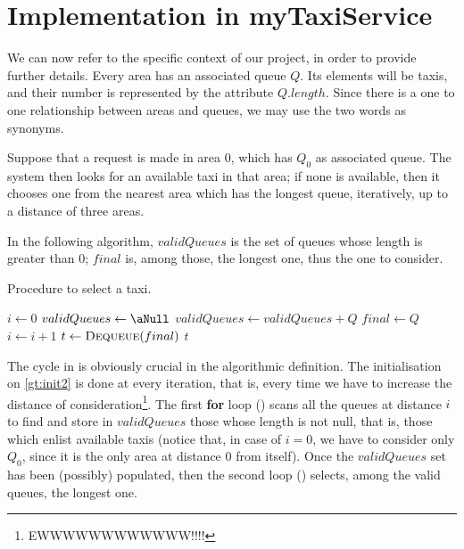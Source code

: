 \clearpage

\section{Implementation in myTaxiService}
We can now refer to the specific context of our project, in order to provide further details. Every area has an associated queue $Q$. Its elements will be taxis, and their number is represented by the attribute $Q.length$. Since there is a one to one relationship between areas and queues, we may use the two words as synonyms.

Suppose that a request is made in area $0$, which has $Q_0$ as associated queue. The system then looks for an available taxi in that area; if none is available, then it chooses one from the nearest area which has the longest queue, iteratively, up to a distance of three areas.

In the following algorithm, $validQueues$ is the set of queues whose length is greater than $0$; $final$ is, among those, the longest one, thus the one to consider.

\begin{algorithm}
\caption{Procedure to select a taxi.} \label{alg:getTaxi}
\begin{algorithmic}[1]
	\State $i \gets 0$  %
	\Repeat \label{gt:repeat}
		\State $validQueues \gets \aNull$ \label{gt:init2}
		\label{gt:forValid}
				\State $validQueues \gets validQueues + Q$
			\EndIf
		\EndFor\label{gt:endForValid}
		\label{gt:forFinal}
				\State $final \gets Q$
			\EndIf
		\EndFor\label{gt:endForFinal}
		\State $i \gets i + 1$
	 \label{gt:until}
	\State $t \gets \Call{Dequeue}{final}$ 
	\State \Return $t$ 
\EndProcedure
\end{algorithmic}
\end{algorithm}

The cycle in  is obviously crucial in the algorithmic definition. The initialisation on \cref{gt:init2} is done at every iteration, that is, every time we have to increase {the distance of consideration}\footnote{EWWWWWWWWWWWW!!!!}. The first \textbf{for} loop () scans all the queues at distance $i$ to find and store in $validQueues$ those whose length is not null, that is, those which enlist available taxis (notice that, in case of $i=0$, we have to consider only $Q_0$, since it is the only area at distance $0$ from itself). Once the $validQueues$ set has been (possibly) populated, then the second loop () selects, among the valid queues, the longest one.

